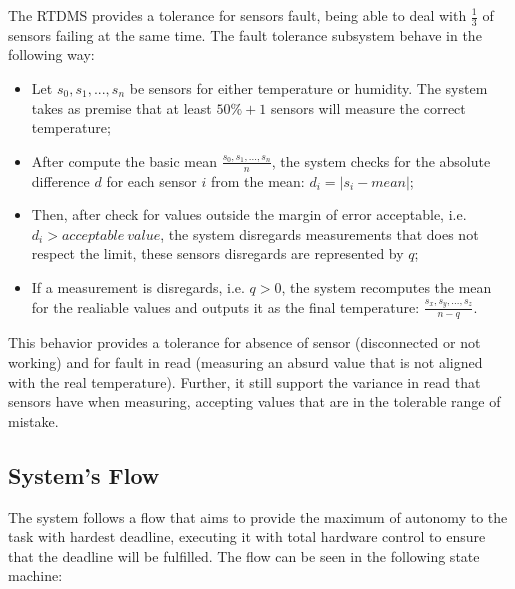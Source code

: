 \documentclass[12pt]{article}
\begin{document}
The RTDMS provides a tolerance for sensors fault, being able to deal with \(\frac{1}{3}\) of sensors failing at the same
time. The fault tolerance subsystem behave in the following way:
\begin{itemize}
 \item Let \(s_0, s_1, ... , s_n\) be sensors for either temperature or humidity. The system takes as premise that at 
 least \(50\% + 1\) sensors will measure the correct temperature;
 \item After compute the basic mean \(\frac{s_0, s_1, ... , s_n}{n}\), the system checks for the absolute difference \(d\) for
 each sensor \(i\) from the mean: \(d_i = |s_i - mean|\);
 \item Then, after check for values outside the margin of error acceptable, i.e. \(d_i > acceptable\ value\), the system 
 disregards measurements that does not respect the limit, these sensors disregards are represented by \(q\);
 \item If a measurement is disregards, i.e. \(q > 0\), the system recomputes the mean for the realiable values and outputs it as the final
 temperature: \(\frac{s_x, s_y, ... , s_z}{n - q}\).
\end{itemize}

This behavior provides a tolerance for absence of sensor (disconnected or not working) and for fault in read (measuring an
absurd value that is not aligned with the real temperature). Further, it still support the variance in read that sensors
have when measuring, accepting values that are in the tolerable range of mistake.

\subsection{System's Flow}
The system follows a flow that aims to provide the maximum of autonomy to the task with hardest deadline, executing
it with total hardware control to ensure that the deadline will be fulfilled. The flow can be seen in the following
state machine:
\end{document}
